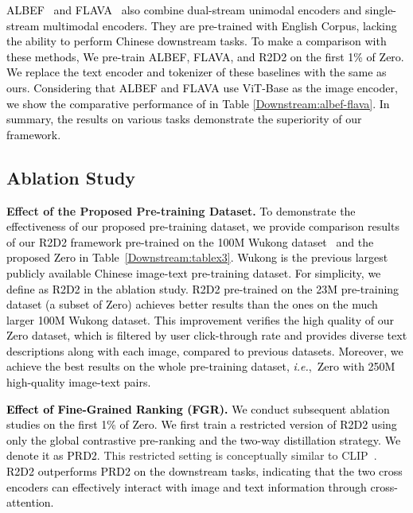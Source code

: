 \documentclass[sigconf]{acmart}
\def\ie{\mbox{\textit{i.e.}, }}
\def\xie{\textcolor{black}}
\def\blue{\textcolor{black}}
\def\mmxie{\textcolor{black}}
\def\mmljc{\textcolor{black}}
\def\mmcr{\textcolor{black}}
\def\pretraindata{Zero}
\begin{document}
\mmxie{ALBEF~\cite{ALBEF} and FLAVA~\cite{FLAVA} also combine dual-stream unimodal encoders and single-stream multimodal encoders. They are pre-trained with English Corpus, lacking the ability to perform Chinese downstream tasks. To make a comparison with these methods, We pre-train ALBEF, FLAVA, and \mmcr{R2D2} on the first 1\% of \mmcr{Zero}. We replace the text encoder and tokenizer of these baselines with the same as ours. Considering that ALBEF and FLAVA use ViT-Base as the image encoder, we show the comparative performance of  in Table \ref{Downstream:albef-flava}. In summary, the results on various tasks \mmljc{demonstrate the superiority} of our framework.
}























\subsection{Ablation Study
}\label{sec:ablation}
\textbf{Effect of the Proposed Pre-training Dataset.} 
\mmxie{To demonstrate the effectiveness of our proposed pre-training dataset, we provide comparison results of our \mmcr{R2D2} framework pre-trained on the 100M Wukong dataset~\cite{gu2022wukong} and the proposed \mmcr{Zero} in Table~\ref{Downstream:tablex3}. \mmxie{Wukong is the \mmljc{previous} largest publicly available Chinese image-text pre-training dataset.} For simplicity, we define  as \mmcr{R2D2} in the ablation study.}
\mmxie{\mmcr{R2D2} pre-trained on the 23M pre-training dataset (a subset of \mmcr{Zero}) achieves better results than the ones on the much larger 100M Wukong dataset. 
This improvement verifies the high quality of our \mmcr{Zero} dataset, which is filtered by user click-through rate and provides diverse text descriptions along with each image, compared to previous datasets.} 
\blue{Moreover, we achieve the best results on the whole pre-training dataset, \ie \mmcr{Zero} with 250M high-quality image-text pairs.
}

\mmxie{\textbf{Effect of Fine-Grained Ranking (\mmcr{FGR}).}}
\xie{We conduct subsequent ablation studies on the first \blue{1\%} of \pretraindata{}.}
\mmxie{We first train a restricted version of \mmcr{R2D2} using only the \mmcr{global contrastive pre-ranking} and the two-way distillation strategy.
We denote it as \mmcr{PRD2}.} This restricted setting is conceptually similar to CLIP~\cite{CLIP}.
\mmxie{\mmcr{R2D2} outperforms \mmcr{PRD2} on the downstream tasks, indicating that the two cross encoders can effectively interact with image and text information through cross-attention.
}
\end{document}

